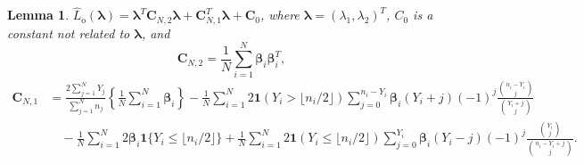 \documentclass[12pt,letterpaper]{article}
\newtheorem{lemma}{Lemma}[section]
\begin{document}
\begin{lemma}\label{lemma:coeff:one-sample}
$\hat{L}_{\mathrm{o}}(\boldsymbol{\lambda})=\boldsymbol{\lambda}^T\mathbf{C}_{N,2}\boldsymbol{\lambda}+\mathbf{C}_{N,1}^T\boldsymbol{\lambda}+\mathbf{C}_0$, where $\boldsymbol{\lambda}=(\lambda_1,\lambda_2)^T$, $C_0$ is a constant not related to $\boldsymbol{\lambda}$, and 
\begin{equation}\label{eq:coefficient:quadratic:ML}
    \mathbf{C}_{N,2}=\frac{1}{N}\sum_{i=1}^N\boldsymbol{\beta}_i\boldsymbol{\beta}_i^T,
\end{equation}
\begin{equation}\label{eq:coeff:linear:one-sample}
\begin{array}{rl}
\mathbf{C}_{N,1}\!\!\!\!\!\!&\displaystyle=\frac{2\sum_{j=1}^NY_j}{\sum_{j=1}^Nn_j}\left\{\frac{1}{N}\sum_{i=1}^N\boldsymbol{\beta}_i\right\}-\frac{1}{N}\sum_{i=1}^N2\mathbf{1}(Y_{i} > \lfloor n_i/2\rfloor)\!\!\!\sum_{j=0}^{n_{i}-Y_{i}}\!\!\boldsymbol{\beta}_i(Y_i+j)(-1)^{j}\frac{\binom{n_i-Y_i}{j}}{\binom{Y_i+j}{j}}\\
&\quad\displaystyle-\frac{1}{N}\sum_{i=1}^N2\boldsymbol{\beta}_i\mathbf{1}\{Y_i\leq \lfloor n_i/2\rfloor\}+\frac{1}{N}\sum_{i=1}^N2\mathbf{1}(Y_{i}\leq \lfloor n_i/2\rfloor)\sum_{j=0}^{Y_{i}}\boldsymbol{\beta}_i(Y_i-j)(-1)^{j}\frac{\binom{Y_i}{j}}{\binom{n_i-Y_i+j}{j}}.
\end{array}
\end{equation} 
\end{lemma}
\end{document}
